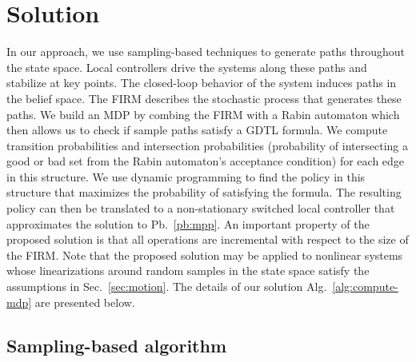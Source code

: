 \section{Solution}
\label{sec:solution}

In our approach, we use sampling-based  techniques to generate paths throughout the state space.
Local controllers drive the systems along these paths and stabilize at key points.
The closed-loop behavior of the system induces paths in the belief space.
The FIRM describes the stochastic process that generates these paths.
We build an MDP by combing the FIRM with a Rabin automaton which then allows us to check if sample paths satisfy a GDTL formula.
We compute transition probabilities and intersection probabilities
(probability of intersecting a good or bad set from the Rabin automaton's
acceptance condition) for each edge in this structure.
We use dynamic programming to find the policy in this structure that maximizes the probability of satisfying the formula.
The resulting policy can then be translated to a non-stationary switched local controller that approximates the solution to Pb.~\ref{pb:mpp}.
An important property of the proposed solution is that all operations
are incremental with respect to the size of the FIRM.
Note that the proposed solution may be applied to nonlinear
systems whose linearizations around random samples in the state
space satisfy the assumptions in Sec.~\ref{sec:motion}.
The details of our solution Alg.~\ref{alg:compute-mdp} are presented below.



\subsection{Sampling-based algorithm}

